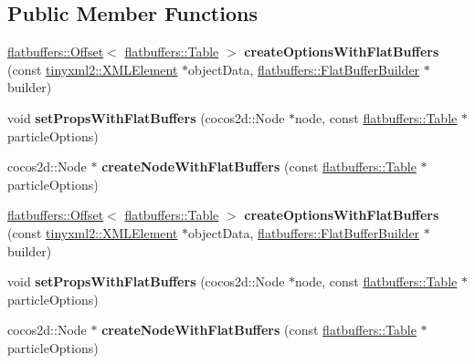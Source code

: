 \subsection*{Public Member Functions}
\begin{DoxyCompactItemize}
\item 
\mbox{\label{classcocostudio_1_1ParticleReader_ad3882a333f43cb944e2d6830dcf148ee}} 
\hyperlink{structflatbuffers_1_1Offset}{flatbuffers\+::\+Offset}$<$ \hyperlink{classflatbuffers_1_1Table}{flatbuffers\+::\+Table} $>$ {\bfseries create\+Options\+With\+Flat\+Buffers} (const \hyperlink{classtinyxml2_1_1XMLElement}{tinyxml2\+::\+X\+M\+L\+Element} $\ast$object\+Data, \hyperlink{classflatbuffers_1_1FlatBufferBuilder}{flatbuffers\+::\+Flat\+Buffer\+Builder} $\ast$builder)
\item 
\mbox{\label{classcocostudio_1_1ParticleReader_a1785ec2956449c90e90236cdcd37b447}} 
void {\bfseries set\+Props\+With\+Flat\+Buffers} (cocos2d\+::\+Node $\ast$node, const \hyperlink{classflatbuffers_1_1Table}{flatbuffers\+::\+Table} $\ast$particle\+Options)
\item 
\mbox{\label{classcocostudio_1_1ParticleReader_a928ba696ea7956fca5c61860104d67be}} 
cocos2d\+::\+Node $\ast$ {\bfseries create\+Node\+With\+Flat\+Buffers} (const \hyperlink{classflatbuffers_1_1Table}{flatbuffers\+::\+Table} $\ast$particle\+Options)
\item 
\mbox{\label{classcocostudio_1_1ParticleReader_a863e384436a19c1c00946dffb005cb6e}} 
\hyperlink{structflatbuffers_1_1Offset}{flatbuffers\+::\+Offset}$<$ \hyperlink{classflatbuffers_1_1Table}{flatbuffers\+::\+Table} $>$ {\bfseries create\+Options\+With\+Flat\+Buffers} (const \hyperlink{classtinyxml2_1_1XMLElement}{tinyxml2\+::\+X\+M\+L\+Element} $\ast$object\+Data, \hyperlink{classflatbuffers_1_1FlatBufferBuilder}{flatbuffers\+::\+Flat\+Buffer\+Builder} $\ast$builder)
\item 
\mbox{\label{classcocostudio_1_1ParticleReader_a1785ec2956449c90e90236cdcd37b447}} 
void {\bfseries set\+Props\+With\+Flat\+Buffers} (cocos2d\+::\+Node $\ast$node, const \hyperlink{classflatbuffers_1_1Table}{flatbuffers\+::\+Table} $\ast$particle\+Options)
\item 
\mbox{\label{classcocostudio_1_1ParticleReader_ae23e31358da39103c7a100d5cfc5efdb}} 
cocos2d\+::\+Node $\ast$ {\bfseries create\+Node\+With\+Flat\+Buffers} (const \hyperlink{classflatbuffers_1_1Table}{flatbuffers\+::\+Table} $\ast$particle\+Options)
\end{DoxyCompactItemize}
